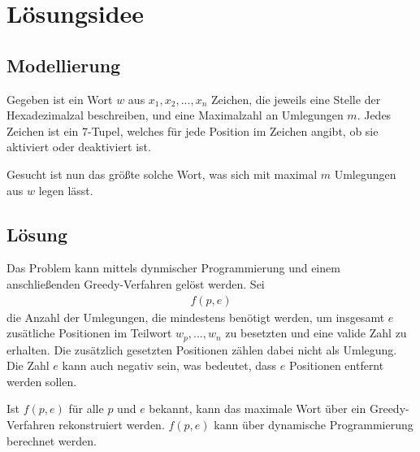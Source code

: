 \documentclass[a4paper,10pt,ngerman]{scrartcl}
\begin{document}
\maketitle
\tableofcontents

\section{Lösungsidee}
\subsection{Modellierung}
Gegeben ist ein Wort $w$ aus $x_1, x_2, ..., x_n$ Zeichen, die jeweils eine Stelle der Hexadezimalzal beschreiben, und eine Maximalzahl an Umlegungen $m$. Jedes Zeichen ist ein 7-Tupel, welches für jede Position im Zeichen angibt, ob sie aktiviert oder deaktiviert ist. 

Gesucht ist nun das größte solche Wort, was sich mit maximal $m$ Umlegungen aus $w$ legen lässt.

\subsection{Lösung}

Das Problem kann mittels dynmischer Programmierung und einem anschließenden Greedy-Verfahren gelöst werden. 
Sei
\begin{align}
    f(p, e)
\end{align}
die Anzahl der Umlegungen, die mindestens benötigt werden, um insgesamt $e$ zusätliche Positionen im Teilwort $w_p, ..., w_n$ zu besetzten und eine valide Zahl zu erhalten. Die zusätzlich gesetzten Positionen zählen dabei nicht als Umlegung. Die Zahl $e$ kann auch negativ sein, was bedeutet, dass $e$ Positionen entfernt werden sollen.

Ist $f(p, e)$ für alle $p$ und $e$ bekannt, kann das maximale Wort über ein Greedy-Verfahren rekonstruiert werden. 
$f(p, e)$ kann über dynamische Programmierung berechnet werden. 
\end{document}
